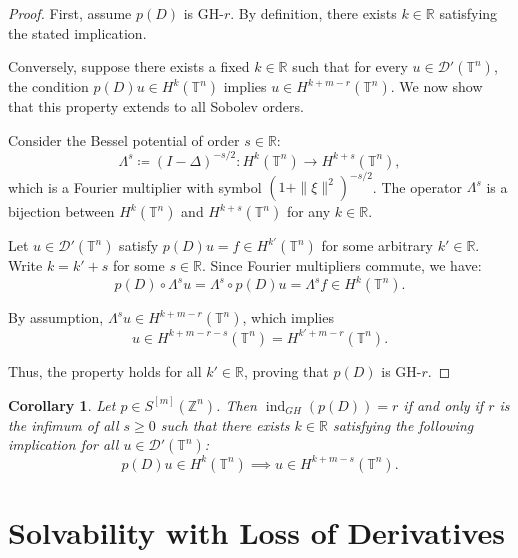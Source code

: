 \documentclass[11pt]{amsart}
\numberwithin{equation}{section}
\newtheorem{corollary}[theorem]{Corollary}
\theoremstyle{definition}
\begin{document}
    \begin{proof}
    	First, assume \( p(D) \) is GH-\( r \). By definition, there exists \( k \in \mathbb{R} \) satisfying the stated implication.
    	
    	Conversely, suppose there exists a fixed \( k \in \mathbb{R} \) such that for every \( u \in \mathscr{D}'(\mathbb{T}^n) \), the condition \( p(D)u \in H^k(\mathbb{T}^n) \) implies \( u \in H^{k + m - r}(\mathbb{T}^n) \). We now show that this property extends to all Sobolev orders.
    	
    	Consider the Bessel potential of order \( s \in \mathbb{R} \):
    	\[
    	\Lambda^s \coloneqq (I - \Delta)^{-s/2}: H^k(\mathbb{T}^n) \to H^{k+s}(\mathbb{T}^n),
    	\]
    	which is a Fourier multiplier with symbol \( (1 + \|\xi\|^2)^{-s/2} \). The operator \( \Lambda^s \) is a bijection between \( H^k(\mathbb{T}^n) \) and \( H^{k+s}(\mathbb{T}^n) \) for any \( k \in \mathbb{R} \).
    	
    	Let \( u \in \mathscr{D}'(\mathbb{T}^n) \) satisfy \( p(D)u = f \in H^{k'}(\mathbb{T}^n) \) for some arbitrary \( k' \in \mathbb{R} \). Write \( k = k' + s \) for some \( s \in \mathbb{R} \). Since Fourier multipliers commute, we have:
    	\[
    	p(D)\circ \Lambda^s u = \Lambda^s \circ p(D)u = \Lambda^s f \in H^k(\mathbb{T}^n).
    	\]
    	
    	By assumption, \( \Lambda^s u \in H^{k + m - r}(\mathbb{T}^n) \), which implies \[ u \in H^{k + m - r - s}(\mathbb{T}^n) = H^{k' + m - r}(\mathbb{T}^n). \]
    	
    	Thus, the property holds for all \( k' \in \mathbb{R} \), proving that \( p(D) \) is GH-\( r \).
    \end{proof}
    
    \begin{corollary}\label{coro_ind_gr_char}
    	Let \( p \in S^{[m]}(\mathbb{Z}^n) \). Then \( \operatorname{ind}_{GH}(p(D)) = r \) if and only if \( r \) is the infimum of all \( s \geq 0 \) such that there exists \( k \in \mathbb{R} \) satisfying the following implication for all \( u \in \mathscr{D}'(\mathbb{T}^n) \):
    	\[
    	p(D)u \in H^k(\mathbb{T}^n) \implies u \in H^{k + m - s}(\mathbb{T}^n).
    	\]
    \end{corollary}
	
	\section{Solvability with Loss of Derivatives}
	
\end{document}
